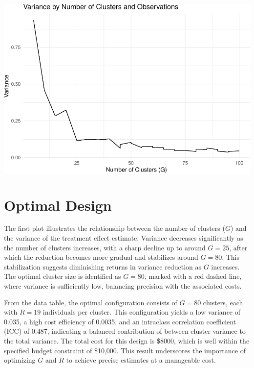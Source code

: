 \documentclass[
]{article}
\begin{document}
\begin{center}\includegraphics{Project3Simulation_files/figure-latex/unnamed-chunk-4-1} \end{center}

\hypertarget{optimal-design}{%
\section{Optimal Design}\label{optimal-design}}

The first plot illustrates the relationship between the number of
clusters (\(G\)) and the variance of the treatment effect estimate.
Variance decreases significantly as the number of clusters increases,
with a sharp decline up to around \(G = 25\), after which the reduction
becomes more gradual and stabilizes around \(G = 80\). This
stabilization suggests diminishing returns in variance reduction as
\(G\) increases. The optimal cluster size is identified as \(G = 80\),
marked with a red dashed line, where variance is sufficiently low,
balancing precision with the associated costs.

From the data table, the optimal configuration consists of \(G = 80\)
clusters, each with \(R = 19\) individuals per cluster. This
configuration yields a low variance of 0.035, a high cost efficiency of
0.0035, and an intraclass correlation coefficient (ICC) of 0.487,
indicating a balanced contribution of between-cluster variance to the
total variance. The total cost for this design is \$8000, which is well
within the specified budget constraint of \$10,000. This result
underscores the importance of optimizing \(G\) and \(R\) to achieve
precise estimates at a manageable cost.
\end{document}
